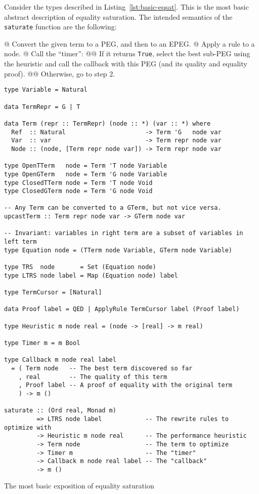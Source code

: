 \documentclass[11pt]{report}
\begin{document}
Consider the types described in Listing~\ref{lst:basic-eqsat}. This is the most
basic abstract description of equality saturation. The intended semantics of the
\texttt{saturate} function are the following:

\begin{easylist}[enumerate]
@ Convert the given term to a PEG, and then to an EPEG.
@ Apply a rule to a node.
@ Call the ``timer'':
@@ {%
  If it returns \texttt{True}, select the best sub-PEG using the heuristic and
  call the callback with this PEG (and its quality and equality proof).
}
@@ {%
  Otherwise, go to step 2.
}
\end{easylist}

\begin{listing}[ht]
\begin{verbatim}
type Variable = Natural

data TermRepr = G | T

data Term (repr :: TermRepr) (node :: *) (var :: *) where
  Ref  :: Natural                      -> Term 'G   node var
  Var  :: var                          -> Term repr node var
  Node :: (node, [Term repr node var]) -> Term repr node var

type OpenTTerm   node = Term 'T node Variable
type OpenGTerm   node = Term 'G node Variable
type ClosedTTerm node = Term 'T node Void
type ClosedGTerm node = Term 'G node Void

-- Any Term can be converted to a GTerm, but not vice versa.
upcastTerm :: Term repr node var -> GTerm node var

-- Invariant: variables in right term are a subset of variables in left term
type Equation node = (TTerm node Variable, GTerm node Variable)

type TRS  node       = Set (Equation node)
type LTRS node label = Map (Equation node) label

type TermCursor = [Natural]

data Proof label = QED | ApplyRule TermCursor label (Proof label)

type Heuristic m node real = (node -> [real] -> m real)

type Timer m = m Bool

type Callback m node real label
  = ( Term node   -- The best term discovered so far
    , real        -- The quality of this term
    , Proof label -- A proof of equality with the original term
    ) -> m ()

saturate :: (Ord real, Monad m)
         => LTRS node label            -- The rewrite rules to optimize with
         -> Heuristic m node real      -- The performance heuristic
         -> Term node                  -- The term to optimize
         -> Timer m                    -- The "timer"
         -> Callback m node real label -- The "callback"
         -> m ()
\end{verbatim}
\caption{The most basic exposition of equality saturation}
\label{lst:basic-eqsat}
\end{listing}
\end{document}
